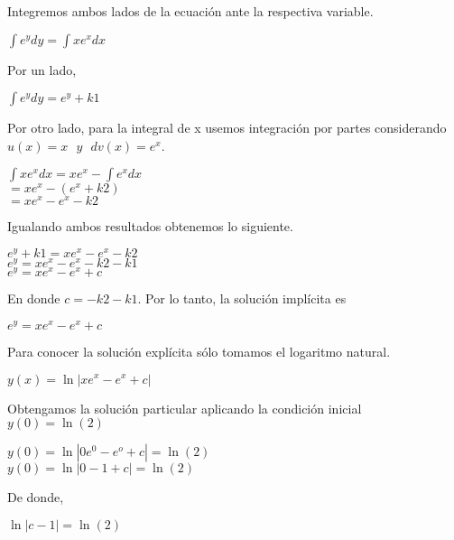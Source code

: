 \documentclass[l etterpaper,11pt]{article}
\begin{document}
Integremos ambos lados de la ecuación ante la respectiva variable.
\begin{center}
$\int e^ydy=\int xe^xdx$\\
\end{center}

Por un lado,
\begin {center}
$\int e^ydy=e^y+k1$\\
\end {center}

Por otro lado, para la integral de x usemos integración por partes considerando $ u(x)=x\ \ \ y\ \ \ dv(x)=e^x$.
\begin {center}

$\int x e^xdx=xe^x-\int e^xdx$\\
$=xe^x-(e^x+k2)$\\
$=xe^x-e^x-k2$\\
\end {center}

Igualando ambos resultados obtenemos lo siguiente.
\begin {center}
$e^y+k1=xe^x-e^x-k2$\\
$e^y=xe^x-e^x-k2-k1$\\
$e^y=xe^x-e^x+c$\\
\end {center}

En donde  $c=-k2-k1$. Por lo tanto, la solución implícita es
\begin {center}
$e^y=xe^x-e^x+c$\\
\end {center}

Para conocer la solución explícita sólo tomamos el logaritmo natural.
\begin {center}
$y(x)=\ln{\left|xe^x-e^x+c\right|}$\\
\end {center}

Obtengamos la solución particular aplicando la condición inicial $y(0)=\ln{(2)}$\\
\begin {center}
$y\left(0\right)=\ln{\left|0e^0-e^o+c\right|=\ln{(2)}}$\\
$y\left(0\right)=\ln{\left|0-1+c\right|=\ln{(2)}}$\\
\end {center}

De donde,
\begin {center}
$\ln{\left|c-1\right|}=\ln{(2)}$\\
\end {center}
\end{document}
